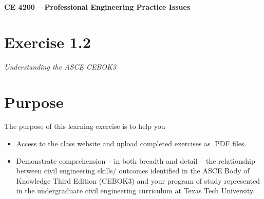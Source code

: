 \documentclass[12pt]{article}
\begin{document}
\begin{center}
{\textbf{{ CE 4200 -- Professional Engineering Practice Issues} }}
\end{center}

\section*{\small{Exercise 1.2}} 
\emph{Understanding the ASCE CEBOK3}


\section*{\small{Purpose}} 
The purpose of this learning exercise is to help you 
\begin{itemize}
\item Access to the class website and upload completed exercises as .PDF files.
\item Demonstrate comprehension – in both breadth and detail – the
relationship between civil engineering skills/ outcomes identified in the ASCE Body of Knowledge Third
Edition (CEBOK3) and your program of study represented in the undergraduate civil engineering
curriculum at Texas Tech University.
\end{itemize}
\end{document}

